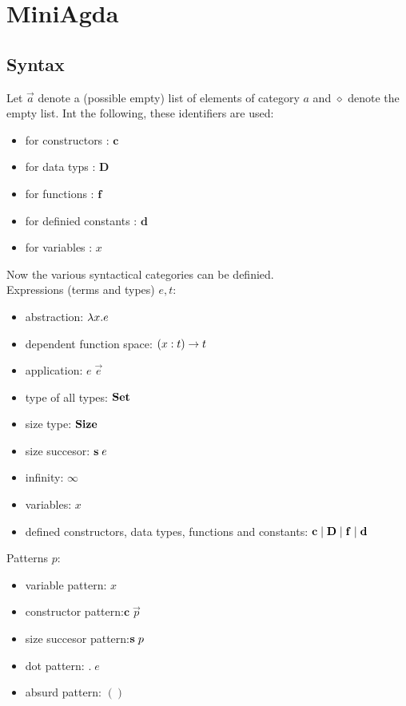 \chapter{MiniAgda}

\newcommand{\dd}{\mathbf{d}}
\newcommand{\DD}{\mathbf{D}}
\newcommand{\cc}{\mathbf{c}}
\newcommand{\ff}{\mathbf{f}}


\section{Syntax}
Let $\vec{a}$ denote a (possible empty) list of elements of category $a$
and $\diamond$ denote the empty list.
Int the following, these identifiers are used:
\begin{itemize}
\item for constructors : $\cc$ 
\item for data typs : $\DD$
\item for functions : $\ff$
\item for definied constants : $\dd$
\item for variables : $x$
\end{itemize}
Now the various syntactical categories can be definied.
\\
Expressions (terms and types) $e,t$:  
\begin{itemize}
\item
abstraction: $ \lambda x . e $ 
\item
dependent function space: $( x : t ) \rightarrow t$ 
\item 
application: $ e \; \vec{e} $ 
\item
type of all types: $ \mathbf{Set} $ 
\item
size type: $ \mathbf{Size} $ 
\item
size succesor: $\mathbf{s}\; e $ 
\item
infinity: $\infty$ 
\item
variables: $x$
\item
defined constructors, data types, functions and constants:
$ \cc \vsp \DD \vsp \ff \vsp \dd$
\end{itemize}
Patterns $p$:
\begin{itemize}
\item
variable pattern: $x$ 
\item
constructor pattern:$ \cc \; \vec{p} $ 
\item
size succesor pattern:$ \mathbf{s}\; p $ 
\item
dot pattern: $ . \; e $ 
\item
absurd pattern: $()$
\end{itemize}
